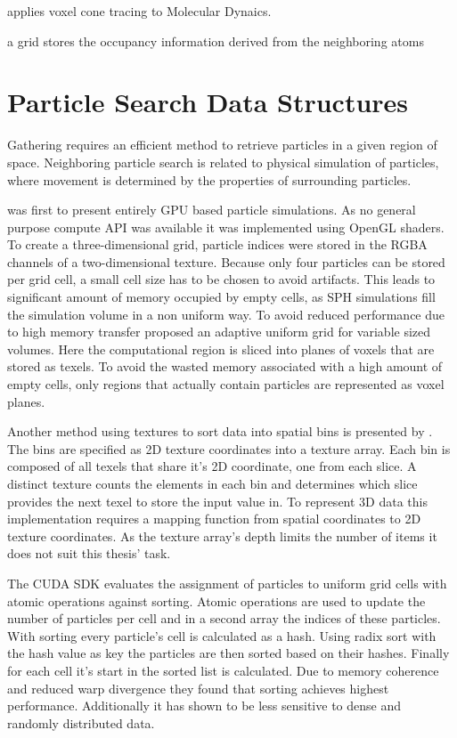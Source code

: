 \documentclass[hyperref,german,diplominf]{cgvpub}
\begin{document}
\cite{10} applies voxel cone tracing to Molecular Dynaics.

\cite{9} a grid stores the occupancy information derived from the neighboring atoms

\section{Particle Search Data Structures}

Gathering requires an efficient method to retrieve particles in a given region of space. Neighboring particle search is related to physical simulation of particles, where movement is determined by the properties of surrounding particles.

\cite{11} was first to present entirely GPU based particle simulations. As no general purpose compute API was available it was implemented using OpenGL shaders. To create a three-dimensional grid, particle indices were stored in the RGBA channels of a two-dimensional texture. Because only four particles can be stored per grid cell, a small cell size has to be chosen to avoid artifacts. This leads to significant amount of memory occupied by empty cells, as SPH simulations fill the simulation volume in a non uniform way. To avoid reduced performance due to high memory transfer  \cite{6} proposed an adaptive uniform grid for variable sized volumes. Here the computational region is sliced into planes of voxels that are stored as texels. To avoid the wasted memory associated with a high amount of empty cells, only regions that actually contain particles are represented as voxel planes.

Another method using textures to sort data into spatial bins is presented by  \cite{14}. The bins are specified as 2D texture coordinates into a texture array. Each bin is composed of all texels that share it's 2D coordinate, one from each slice. A distinct texture counts the elements in each bin and determines which slice provides the next texel to store the input value in. To represent 3D data this implementation requires a mapping function from spatial coordinates to 2D texture coordinates. As the texture array's depth limits the number of items it does not suit this thesis' task.

The CUDA SDK  \cite{5} evaluates the assignment of particles to uniform grid cells with atomic operations against sorting. Atomic operations are used to update the number of particles per cell and in a second array the indices of these particles. With sorting every particle's cell is calculated as a hash. Using radix sort with the hash value as key the particles are then sorted based on their hashes. Finally for each cell it's start in the sorted list is calculated. Due to memory coherence and reduced warp divergence they found that sorting achieves highest performance. Additionally it has shown to be less sensitive to dense and randomly distributed data.
\end{document}
